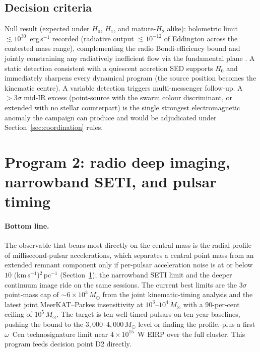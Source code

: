 \documentclass[11pt]{article}
\newcommand{\msun}{\ensuremath{M_\odot}}
\newcommand{\ocen}{\ensuremath{\omega}~Cen}
\begin{document}
\subsection{Decision criteria}

Null result (expected under $H_0$, $H_1$, and mature-$H_2$ alike): bolometric limit $\lesssim 10^{30}$~erg\,s$^{-1}$ recorded (radiative output $\lesssim 10^{-12}$ of Eddington across the contested mass range), complementing the radio Bondi-efficiency bound and jointly constraining any radiatively inefficient flow via the fundamental plane \citep{Merloni2003,Mahida2026}. A static detection consistent with a quiescent accretion SED supports $H_0$ and immediately sharpens every dynamical program (the source position becomes the kinematic centre). A variable detection triggers multi-messenger follow-up. A $>3\sigma$ mid-IR excess (point-source with the swarm colour discriminant, or extended with no stellar counterpart) is the single strongest electromagnetic anomaly the campaign can produce and would be adjudicated under Section~\ref{sec:coordination} rules.

\section{Program 2: radio deep imaging, narrowband SETI, and pulsar timing}
\label{sec:radio}

\paragraph{Bottom line.} The observable that bears most directly on the central mass is the radial profile of millisecond-pulsar accelerations, which separates a central point mass from an extended remnant component only if per-pulsar acceleration noise is at or below $10$ (km\,s$^{-1}$)$^{2}$\,pc$^{-1}$ (Section~\ref{sec:radio}); the narrowband SETI limit and the deeper continuum image ride on the same sessions. The current best limits are the $3\sigma$ point-mass cap of $\sim6\times10^{3}\,\msun$ from the joint kinematic-timing analysis and the latest joint MeerKAT--Parkes insensitivity at $10^{3}$--$10^{4}\,\msun$ with a $90$-per-cent ceiling of $10^{5}\,\msun$. The target is ten well-timed pulsars on ten-year baselines, pushing the bound to the $3{,}000$--$4{,}000\,\msun$ level or finding the profile, plus a first \ocen{} technosignature limit near $4\times10^{15}$~W EIRP over the full cluster. This program feeds decision point D2 directly.
\end{document}

